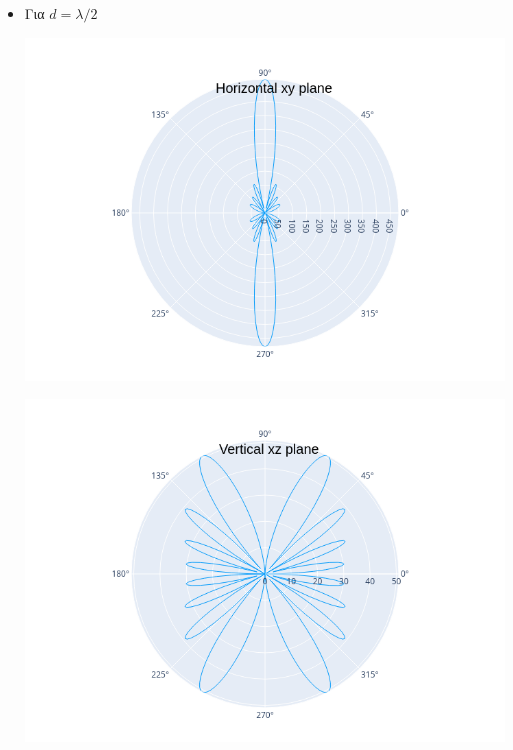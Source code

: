\documentclass[12pt]{article}
\begin{document}
\begin{itemize}
    \item Για \(d = \lambda/2\)
    \begin{center}
        \includegraphics*[scale=0.6]{050xy.png}
    \end{center}
    \begin{center}
        \includegraphics*[scale=0.6]{050xz.png}
    \end{center}


\end{itemize}
\end{document}
